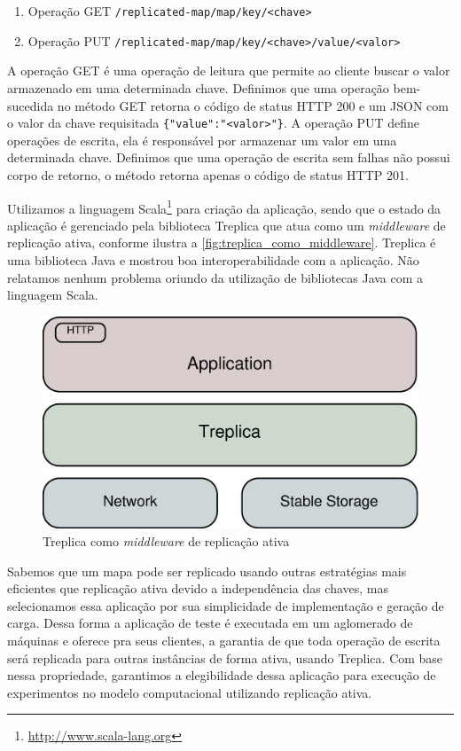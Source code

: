 \begin{enumerate}
  \item Operação GET \verb|/replicated-map/map/key/<chave>|
  \item Operação PUT \verb|/replicated-map/map/key/<chave>/value/<valor>|
\end{enumerate}

A operação GET é uma operação de leitura que permite ao cliente buscar o valor armazenado
em uma determinada chave. Definimos que uma operação bem-sucedida no método GET retorna o
código de status HTTP 200 e um JSON com o valor da chave requisitada
\verb|{"value":"<valor>"}|. A operação PUT define operações de escrita, ela é responsável
por armazenar um valor em uma determinada chave. Definimos que uma operação de escrita sem
falhas não possui corpo de retorno, o método retorna apenas o código de status HTTP 201.

Utilizamos a linguagem Scala\footnote{\url{http://www.scala-lang.org}} para criação da
aplicação, sendo que o estado da aplicação é gerenciado pela biblioteca Treplica que atua
como um \emph{middleware} de replicação ativa, conforme ilustra a
\autoref{fig:treplica_como_middleware}. Treplica é uma biblioteca Java e mostrou boa
interoperabilidade com a aplicação. Não relatamos nenhum problema oriundo da utilização de
bibliotecas Java com a linguagem Scala.

\begin{figure}[ht]
  \centering
  \includegraphics[width=12cm]{conteudo/capitulos/figuras/block-treplica.eps}
  \caption{Treplica como \emph{middleware} de replicação ativa}
  \label{fig:treplica_como_middleware}
\end{figure}

Sabemos que um mapa pode ser replicado usando outras estratégias mais eficientes que
replicação ativa devido a independência das chaves, mas selecionamos essa aplicação por
sua simplicidade de implementação e geração de carga. Dessa forma a aplicação de teste é
executada em um aglomerado de máquinas e oferece pra seus clientes, a garantia de que toda
operação de escrita será replicada para outras instâncias de forma ativa, usando Treplica.
Com base nessa propriedade, garantimos a elegibilidade dessa aplicação para execução de
experimentos no modelo computacional utilizando replicação ativa.

